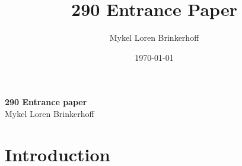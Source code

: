 \documentclass[12pt, letterpaper]{article}
\title{290 Entrance Paper }
\author{Mykel Loren Brinkerhoff}
\date{\today}
\begin{document}
	
	
	
\begin{center}
	{\Large \textbf{290 Entrance paper}}\\
	\vspace{6pt}
	Mykel Loren Brinkerhoff\\
\end{center}
\thispagestyle{fancy}



\section{Introduction} \label{sec:INTRO}
\end{document}
